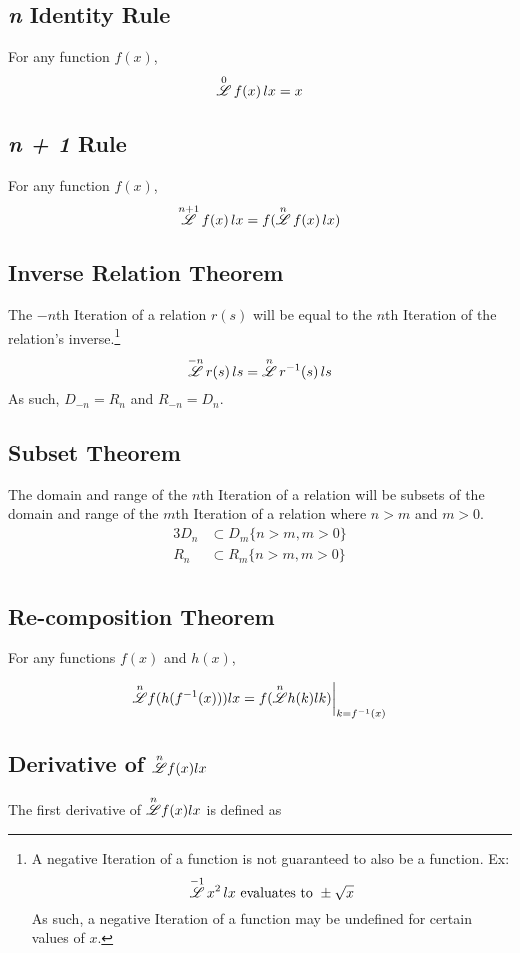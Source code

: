 \documentclass[12pt, letterpaper]{article}
\begin{document}
\subsection{\textit{n} Identity Rule}
For any function $f(x)$, 
\[
\overset{0}{\mathscr{L}} \, f(x) \, lx = x
\]

\subsection{\textit{n + 1} Rule}
For any function $f(x)$, 
\[
\overset{n+1}{\mathscr{L}} \, f(x) \, lx = f(\overset{n}{\mathscr{L}} \, f(x) \, lx)
\]

\subsection{Inverse Relation Theorem}
The $-n$th Iteration of a relation $r(s)$ will be equal to the $n$th Iteration of the relation's inverse.\footnote{A negative Iteration of a function is not guaranteed to also be a function. Ex:$$\overset{-1}{\mathscr{L}} \, x^2 \, lx \text{ evaluates to } \pm\sqrt{x}$$ As such, a negative Iteration of a function may be undefined for certain values of $x$.}
\[
\overset{-n}{\mathscr{L}} \, r(s) \, ls = \overset{n}{\mathscr{L}} \, r^{-1}(s) \, ls
\]
As such, $D_{-n} = R_n$ and $R_{-n} = D_n$.

\subsection{Subset Theorem}
The domain and range of the $n$th Iteration of a relation will be subsets of the domain and range of the $m$th Iteration of a relation where $n > m$ and $m > 0$.
\begin{alignat*}{3}
    D_n&\subset D_m \{n > m, m > 0\}\\
    R_n&\subset R_m \{n > m, m > 0\}\\
\end{alignat*}

\subsection{Re-composition Theorem}
For any functions $f(x)$ and $h(x)$,

\begin{align*}
    \overset{n}{\mathscr{L}}f(h(f^{-1}(x)))lx &= f(\overset{n}{\mathscr{L}}h(k)lk)\bigg|_{k=f^{-1}(x)} \\
\end{align*}

\subsection{Derivative of $\overset{n}{\mathscr{L}}f(x)lx$}
The first derivative of $\overset{n}{\mathscr{L}}f(x)lx$ is defined as
\end{document}
